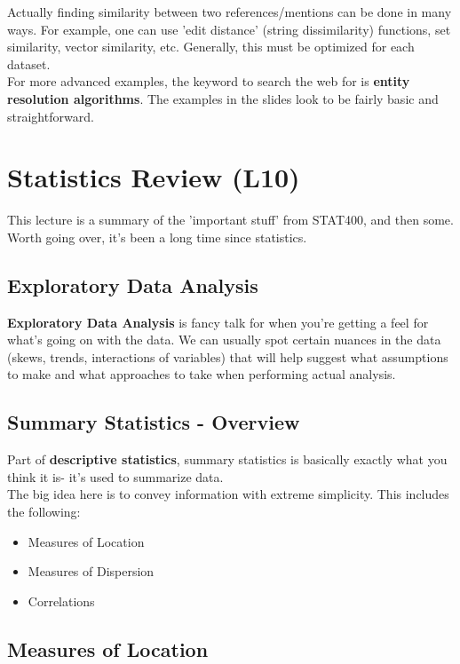 \documentclass[english, 10pt]{article}
\begin{document}
Actually finding similarity between two references/mentions can be done in many ways. For example, one can use 'edit distance' (string dissimilarity) functions, set similarity, vector similarity, etc. Generally, this must be optimized for each dataset.\\

For more advanced examples, the keyword to search the web for is \textbf{entity resolution algorithms}. The examples in the slides look to be fairly basic and straightforward.

\section{Statistics Review (L10)}

This lecture is a summary of the 'important stuff' from STAT400, and then some. Worth going over, it's been a long time since statistics.

\subsection{Exploratory Data Analysis}

\textbf{Exploratory Data Analysis} is fancy talk for when you're getting a feel for what's going on with the data. We can usually spot certain nuances in the data (skews, trends, interactions of variables) that will help suggest what assumptions to make and what approaches to take when performing actual analysis.

\subsection{Summary Statistics - Overview}

Part of \textbf{descriptive statistics}, summary statistics is basically exactly what you think it is- it's used to summarize data.\\

The big idea here is to convey information with extreme simplicity. This includes the following:

\begin{itemize}
	\item Measures of Location
	\item Measures of Dispersion
	\item Correlations
\end{itemize}

\subsection{Measures of Location}
\end{document}
